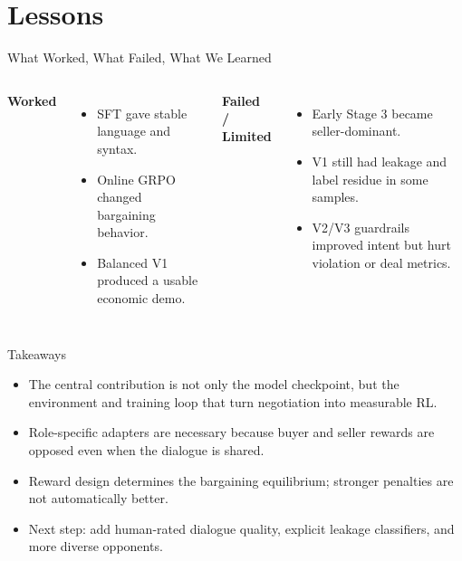 \documentclass{beamer}
\begin{document}
\section{Lessons}

\begin{frame}{What Worked, What Failed, What We Learned}
\begin{columns}
\textbf{Worked}
\begin{itemize}
    \item SFT gave stable language and syntax.
    \item Online GRPO changed bargaining behavior.
    \item Balanced V1 produced a usable economic demo.
\end{itemize}
\textbf{Failed / Limited}
\begin{itemize}
    \item Early Stage 3 became seller-dominant.
    \item V1 still had leakage and label residue in some samples.
    \item V2/V3 guardrails improved intent but hurt violation or deal metrics.
\end{itemize}
\end{columns}
\end{frame}

\begin{frame}{Takeaways}
\begin{itemize}
    \item The central contribution is not only the model checkpoint, but the
    environment and training loop that turn negotiation into measurable RL.
    \item Role-specific adapters are necessary because buyer and seller rewards
    are opposed even when the dialogue is shared.
    \item Reward design determines the bargaining equilibrium; stronger penalties
    are not automatically better.
    \item Next step: add human-rated dialogue quality, explicit leakage classifiers,
    and more diverse opponents.
\end{itemize}
\end{frame}
\end{document}
